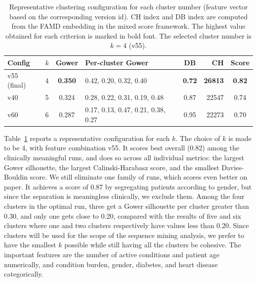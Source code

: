 \begin{table}[t]

\caption{Representative clustering configuration for each cluster number (feature vector based on the corresponding version id). CH index and DB index are computed from the FAMD embedding in the mixed score framework. The highest value obtained for each criterion is marked in bold font. The selected cluster number is $k=4$ (v55).}

\label{tab:clusters}

\centering

\footnotesize

\begin{tabular}{@{}l c c l c r c@{}}

\toprule

Config & $k$ & Gower & Per-cluster Gower & DB & CH & Score \\

\midrule

v55 (final) & 4 & \textbf{0.350} & 0.42, 0.20, 0.32, 0.40 & \textbf{0.72} & \textbf{26813} & \textbf{0.82} \\

v40 & 5 & 0.324 & 0.28, 0.22, 0.31, 0.19, 0.48 & 0.87 & 22547 & 0.74 \\

v60 & 6 & 0.287 & 0.17, 0.13, 0.47, 0.21, 0.38, 0.27 & 0.95 & 22273 & 0.70 \\

\bottomrule

\end{tabular}

\end{table}

Table~\ref{tab:clusters} reports a representative configuration for each $k$. The choice of $k$ is made to be 4, with feature combination v55. It scores best overall (0.82) among the clinically meaningful runs, and does so across all individual metrics: the largest Gower silhouette, the largest Calinski-Harabasz score, and the smallest Davies-Bouldin score. We still eliminate one family of runs, which scores even better on paper. It achieves a score of 0.87 by segregating patients according to gender, but since the separation is meaningless clinically, we exclude them. Among the four clusters in the optimal run, three get a Gower silhouette per cluster greater than 0.30, and only one gets close to 0.20, compared with the results of five and six clusters where one and two clusters respectively have values less than 0.20. Since clusters will be used for the scope of the sequence mining analysis, we prefer to have the smallest $k$ possible while still having all the clusters be cohesive. The important features are the number of active conditions and patient age numerically, and condition burden, gender, diabetes, and heart disease categorically.

